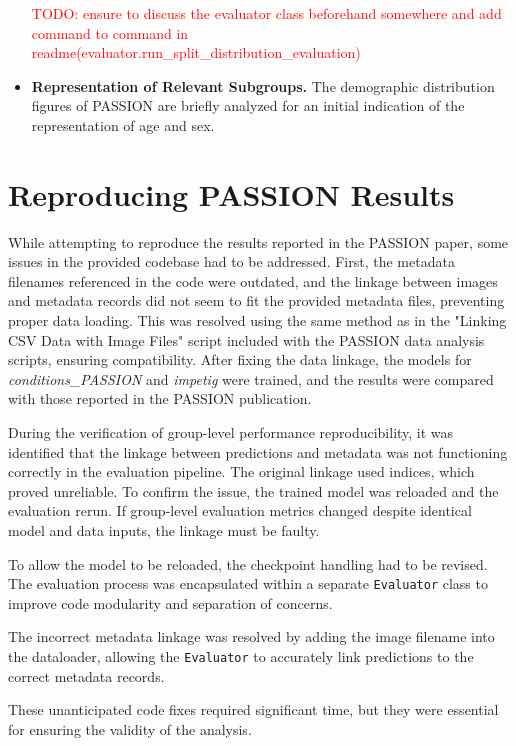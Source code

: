 \documentclass[12pt, a4paper, oneside]{book}   	%
\renewcommand{\todo}[1]{\textcolor{red}{TODO: #1}}
\begin{document}
\begin{itemize}
			\todo{ensure to discuss the evaluator class beforehand somewhere and add command to command in readme(evaluator.run\_split\_distribution\_evaluation)} 
			
			\item \textbf{Representation of Relevant Subgroups.} The demographic distribution figures of PASSION are briefly analyzed for an initial indication of the representation of age and sex.
		\end{itemize}
		
		
		\section{Reproducing PASSION Results}
		While attempting to reproduce the results reported in the PASSION paper, some issues in the provided codebase had to be addressed. First, the metadata filenames referenced in the code were outdated, and the linkage between images and metadata records did not seem to fit the provided metadata files, preventing proper data loading. This was resolved using the same method as in the "Linking CSV Data with Image Files" script included with the PASSION data analysis scripts, ensuring compatibility. After fixing the data linkage, the models for \textit{conditions\_PASSION} and \textit{impetig} were trained, and the results were compared with those reported in the PASSION publication.
		
		During the verification of group-level performance reproducibility, it was identified that the linkage between predictions and metadata was not functioning correctly in the evaluation pipeline. The original linkage used indices, which proved unreliable. To confirm the issue, the trained model was reloaded and the evaluation rerun. If group-level evaluation metrics changed despite identical model and data inputs, the linkage must be faulty.
		
		To allow the model to be reloaded, the checkpoint handling had to be revised. The evaluation process was encapsulated within a separate \texttt{Evaluator} class to improve code modularity and separation of concerns.
		
		The incorrect metadata linkage was resolved by adding the image filename into the dataloader, allowing the \texttt{Evaluator} to accurately link predictions to the correct metadata records.
		
		These unanticipated code fixes required significant time, but they were essential for ensuring the validity of the analysis.
\end{document}
